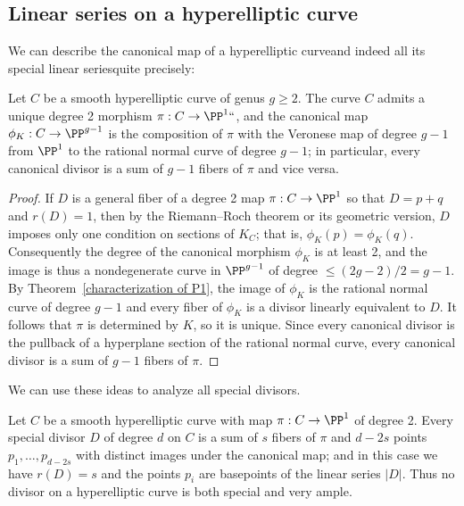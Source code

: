 \subsection*{Linear series on a hyperelliptic curve}
We can describe the canonical map of a hyperelliptic curve\emdash and indeed all its special linear series\emdash quite precisely:

\begin{corollary}\label{canonical on hyperelliptic}
Let $C$ be a smooth hyperelliptic curve of genus $g\geq 2$. The curve $C$ admits a unique degree 2 morphism $\pi: C\to \PP^1` `$,
and the canonical map $\phi_K: C\to \PP^{g-1}$ is the composition of $\pi$ with the Veronese map of degree $g-1$ from
%
$\PP^1$ to the rational normal curve of degree $g-1$; in particular, every canonical divisor is a sum of $g-1$ fibers of $\pi$ and vice versa.
\end{corollary}

\begin{proof}
If $D$ is a general fiber of a degree 2 map $\pi:C\to \PP^1$ so that $D= p+q$ and $r(D) = 1$, then by the Riemann--Roch theorem or its geometric version, $D$ imposes only one condition on sections of $K_C$; that is, $\phi_K(p) = \phi_K(q)$. Consequently the degree of the canonical morphism $\phi_K$ is at least 2, and the image is thus a nondegenerate curve in $\PP^{g-1}$ of degree $\leq (2g-2)/2 = g-1$. By Theorem~\ref{characterization of P1}, the image of $\phi_K$ is the rational normal curve of degree $g-1$ and every fiber of $\phi_K$ is a divisor linearly equivalent to $D$. It follows that $\pi$ is determined by $K$, so it is unique. Since every canonical divisor is the pullback of a hyperplane section of the rational normal curve,
every canonical divisor is a sum of $g-1$ fibers of $\pi$.
\end{proof}

We can use these ideas to analyze all special divisors.
%
%

\begin{corollary}\label{special on hyperelliptic} Let $C$ be a smooth 
hyperelliptic curve
%
with map $\pi: C\to \PP^1$ of degree 2.
Every special divisor $D$ of degree $d$ on 
$C$ is a sum of $s$ fibers of $\pi$ and $d-2s$ points
$p_1,\dots,p_{d-2s}$ with distinct images under the canonical map; and
in this case we have $r(D) = s$ and the points $p_i$ are basepoints
of the linear series $|D|$.
Thus
no divisor on a hyperelliptic curve is both special and very ample.
\end{corollary}

